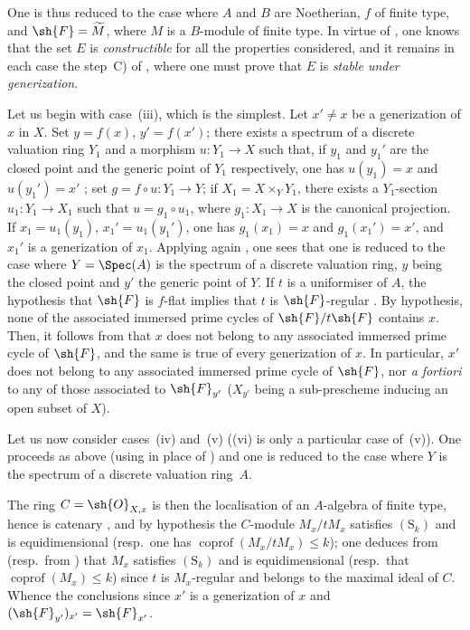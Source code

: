 One is thus reduced to the case where $A$ and $B$ are Noetherian, $f$ of finite type, and $\sh{F}=\widetilde{M}$, where $M$ is a $B$-module of finite type.
In virtue of , one knows that the set $E$ is \emph{constructible} for all the properties considered, and it remains in each case the step~C) of , where one must prove that $E$ is \emph{stable under generization}.

\begin{env}[12.1.1.1]
\label{IV.12.1.1.1}
Let us begin with case~(iii), which is the simplest.
Let $x'\neq x$ be a generization of $x$ in $X$.
Set $y=f(x)$, $y'=f(x')$; there exists a spectrum of a discrete valuation ring $Y_1$ and a morphism $u:Y_1\to X$ such that, if $y_1$ and $y_1'$ are the closed point and the generic point of $Y_1$ respectively, one has $u(y_1)=x$ and $u(y_1')=x'$ ; set $g=f\circ u:Y_1\to Y$; if $X_1=X\times_Y Y_1$, there exists a $Y_1$-section $u_1:Y_1\to X_1$ such that $u=g_1\circ u_1$, where $g_1:X_1\to X$ is the canonical projection.
If $x_1=u_1(y_1)$, $x_1'=u_1(y_1')$, one has $g_1(x_1)=x$ and $g_1(x_1')=x'$, and $x_1'$ is a generization of $x_1$.
Applying again , one sees
that one is reduced to the case where $Y=\Spec(A)$ is the spectrum of a discrete valuation ring, $y$ being the closed point and $y'$ the generic point of $Y$.
If $t$ is a uniformiser of $A$, the hypothesis that $\sh{F}$ is $f$-flat implies that $t$ is $\sh{F}$-regular .
By hypothesis, none of the associated immersed prime cycles of $\sh{F}/t\sh{F}$ contains $x$.
Then, it follows from  that $x$ does not belong to any associated immersed prime cycle of $\sh{F}$, and the same is true of every generization of $x$.
In particular, $x'$ does not belong to any associated immersed prime cycle of $\sh{F}$, nor \emph{a fortiori} to any of those associated to $\sh{F}_{y'}$ ($X_{y'}$ being a sub-prescheme inducing an open subset of $X$).
\end{env}

\begin{env}[12.1.1.2]
\label{IV.12.1.1.2}
Let us now consider cases~(iv) and~(v) ((vi) is only a particular case of~(v)).
One proceeds as above (using  in place of ) and one is reduced to the case where $Y$ is the spectrum of a discrete valuation ring~$A$.

The ring $C=\sh{O}_{X,x}$ is then the localisation of an $A$-algebra of finite type, hence is catenary , and by hypothesis the $C$-module $M_x/tM_x$ satisfies $(\mathrm{S}_k)$ and is equidimensional (resp.\ one has $\operatorname{coprof}(M_x/tM_x)\leqslant k$); one deduces from  (resp.\ from ) that $M_x$ satisfies $(\mathrm{S}_k)$ and is equidimensional (resp.\ that $\operatorname{coprof}(M_x)\leqslant k$) since $t$ is $M_x$-regular and belongs to the maximal ideal of $C$.
Whence the conclusions since $x'$ is a generization of $x$ and $(\sh{F}_{y'})_{x'}=\sh{F}_{x'}$.
\end{env}

